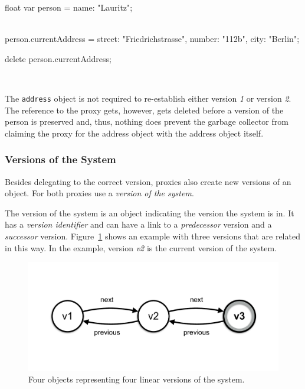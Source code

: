 \begin{code}{}{float}
    var person = {name: "Lauritz"};
    
    \\ [preserve first version]
    
    person.currentAddress = {street: "Friedrichstrasse",
                             number: "112b",
                             city: "Berlin"};
    
    delete person.currentAddress;
    
    \\ [preserve second version]
\end{code}
\iffalse
\end{verbatim}\fi

The \lstinline{address} object is not required to re-establish either version \emph{1} or version \emph{2}.
The reference to the proxy gets, however, gets deleted before a version of the person is preserved and, thus, nothing does prevent the garbage collector from claiming the proxy for the address object with the address object itself.


\subsubsection{Versions of the System}

Besides delegating to the correct version, proxies also create new versions of an object.
For both proxies use a \emph{version of the system}.

The version of the system is an object indicating the version the system is in.
It has a \emph{version identifier} and can have a link to a \emph{predecessor} version and a \emph{successor} version.
Figure~\ref{fig:SystemVersions} shows an example with three versions that are related in this way.
In the example, version \emph{v2} is the current version of the system.

\begin{figure}[h]
    \centering
    \includegraphics[width=\textwidth]{figures/4_approach/8_systemVersions.pdf}
    \caption{Four objects representing four linear versions of the system.}
    \label{fig:SystemVersions}
\end{figure}

